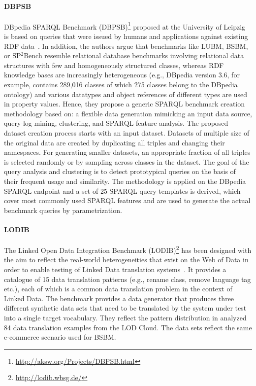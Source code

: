\paragraph{DBPSB} DBpedia SPARQL Benchmark (DBPSB)\footnote{\url{http://aksw.org/Projects/DBPSB.html}} proposed at the University of Leipzig is based on queries that were issued by humans and applications
against existing RDF data~\cite{Morsey2011,Morsey:2012:UBR:2900929.2901031}. In addition, the authors argue that benchmarks like LUBM, BSBM, or SP$^2$Bench resemble relational database benchmarks involving relational data structures with few and homogeneously structured classes, whereas RDF knowledge bases are increasingly heterogeneous (e.g., DBpedia version 3.6, for example, contains 289,016 classes of which 275 classes belong
to the DBpedia ontology) and various datatypes and object references of different types are
used in property values. Hence, they propose a generic SPARQL benchmark creation methodology based on: a flexible data generation mimicking an input data source, query-log mining, clustering, and SPARQL feature analysis. The proposed dataset creation process starts with an input dataset. Datasets of multiple size of the original data are created by duplicating all triples and changing their namespaces.  For generating smaller datasets, an appropriate fraction of all triples is selected randomly or by sampling across classes in the dataset. The goal of the query analysis and clustering is to detect prototypical queries on the basis of their frequent usage and similarity. The methodology is applied on the DBpedia SPARQL endpoint and a set of 25 SPARQL query templates is derived, which cover most commonly used SPARQL features and are used to generate the actual benchmark queries by parametrization.

\paragraph{LODIB} The Linked Open Data Integration Benchmark (LODIB)\footnote{\url{http://lodib.wbsg.de/}} has been designed with the aim to reflect the real-world heterogeneities that exist on the Web of Data in order to enable testing of Linked Data translation systems~\cite{DBLP:conf/www/RiveroSBR12}. It provides a catalogue of 15 data translation patterns (e.g., rename class, remove language tag etc.), each of which is a common data translation problem in the context of Linked Data. The benchmark provides a data generator that produces three different synthetic data sets that need to be translated
by the system under test into a single target vocabulary. They  reflect the pattern distribution in analyzed 84 data translation examples from the LOD Cloud. The data sets reflect the same e-commerce scenario used for BSBM.


